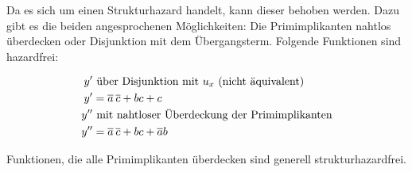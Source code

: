Da es sich um einen Strukturhazard handelt, kann dieser behoben werden. Dazu gibt es die beiden angesprochenen Möglichkeiten: Die Primimplikanten nahtlos überdecken oder Disjunktion mit dem Übergangsterm. Folgende Funktionen sind hazardfrei:

\begin{align*}
y'  &\textnormal{ über Disjunktion mit $u_x$ (nicht äquivalent) } \\ 
y'  &= \overline{a}\hspace{2pt}\overline{c}  + bc + c  \\
y'' &\textnormal{ mit nahtloser Überdeckung der Primimplikanten} \\
y'' &= \overline{a}\hspace{2pt}\overline{c}  + bc + \overline{a}b \\
\end{align*}

Funktionen, die alle Primimplikanten überdecken sind generell strukturhazardfrei.




